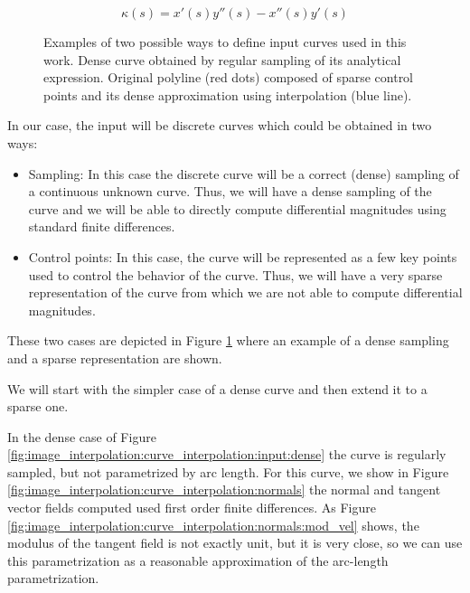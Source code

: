\documentclass{ipol}
\newcommand{\chapFiveDir}{images/chapter_05a}
\begin{document}
\begin{equation}
\kappa (s)=x'(s)y''(s)-x''(s)y'(s)
\label{eq:image_interpolation:curve_interpolation:curvature_reparametrized}
\end{equation}

\begin{figure}[h]
	\centering
	\caption{Examples of two possible ways to define input curves used in this work. 
		\protect{} Dense curve obtained by regular sampling of its analytical expression.
		\protect{} Original polyline (red dots) composed of sparse control points and its dense approximation using interpolation (blue line). }
	\label{fig:image_interpolation:curve_interpolation:input}
\end{figure}

In our case, the input will be discrete curves which could be obtained in two ways: 
\begin{itemize}
 \item Sampling: In this case the discrete curve will be a correct (dense) sampling of a continuous unknown curve. Thus, we will have a dense sampling of the curve and we will be able to directly compute differential magnitudes using standard finite differences.
 \item Control points: In this case, the curve will be represented as a few key points used to control the behavior of the curve. Thus, we will have a very sparse representation of the curve from which we are not able to compute differential magnitudes.
\end{itemize}

These two cases are depicted in Figure \ref{fig:image_interpolation:curve_interpolation:input} where an example of a dense sampling and a sparse representation are shown.

We will start with the simpler case of a dense curve and then extend it to a sparse one.

In the dense case of Figure \ref{fig:image_interpolation:curve_interpolation:input:dense} the curve is regularly sampled, but not parametrized by arc length. For this curve, we show in Figure \ref{fig:image_interpolation:curve_interpolation:normals} the normal and tangent vector fields computed used first order finite differences. As Figure \ref{fig:image_interpolation:curve_interpolation:normals:mod_vel} shows, the modulus of the tangent field is not exactly unit, but it is very close, so we can use this parametrization as a reasonable approximation of the arc-length parametrization. %
\end{document}
